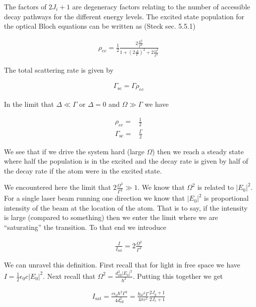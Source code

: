 \documentclass[12pt]{article}
\begin{document}
The factors of $2J_i+1$ are degeneracy factors relating to the number of accessible decay pathways for the different energy levels.
The excited state population for the optical Bloch equations can be written as (Steck sec. 5.5.1)

\begin{align}
\rho_{ee} = \frac{1}{2} \frac{2 \frac{\Omega^2}{\Gamma^2}}{1 + \left(2\frac{\Delta}{\Gamma} \right)^2 + 2 \frac{\Omega^2}{\Gamma^2}}
\end{align}

The total scattering rate is given by

\begin{align}
\Gamma_{\text{sc}} = \Gamma \rho_{ee}
\end{align}

In the limit that $\Delta \ll \Gamma$ or $\Delta =0$ and $\Omega \gg \Gamma$ we have

\begin{align}
\rho_{ee} =& \frac{1}{2}\\
\Gamma_{\text{sc}} =& \frac{\Gamma}{2}
\end{align}

We see that if we drive the system hard (large $\Omega$) then we reach a steady state where half the population is in the excited and the decay rate is given by half of the decay rate if the atom were in the excited state.

We encountered here the limit that $2 \frac{\Omega^2}{\Gamma^2} \gg 1$. We know that $\Omega^2$ is related to $|E_0|^2$. For a single laser beam running one direction we know that $|E_0|^2$ is proportional intensity of the beam at the location of the atom. That is to say, if the intensity is large (compared to something) then we enter the limit where we are ``saturating'' the transition. To that end we introduce

\begin{align}
\frac{I}{I_{\text{sat}}} = 2\frac{\Omega^2}{\Gamma^2}
\end{align}

We can unravel this definition. First recall that for light in free space we have $I = \frac{1}{2} \epsilon_0 c |E_0|^2$. Next recall that $\Omega^2 = \frac{d_{\text{eff}}^2 |E_0|^2}{\hbar^2}$. Putting this together we get

\begin{align}
I_{\text{sat}} = \frac{c \epsilon_0 \hbar^2 \Gamma^2}{4 d_{\text{eff}}^2} = \frac{\hbar \omega^3 \Gamma}{4\pi c^2} \frac{2J_g+1}{2J_e+1}
\end{align}
\end{document}
